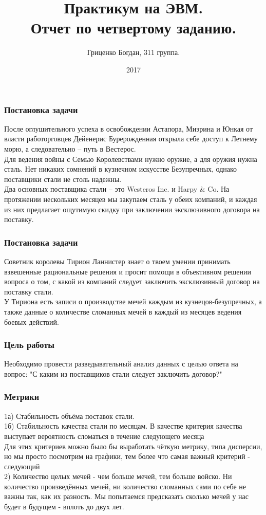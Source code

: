\documentclass[8pt]{beamer}
\title{Практикум на ЭВМ.\\ Отчет по четвертому заданию.}
\author{Гриценко Богдан, 311 группа.}
\institute{МГУ имени М.В. Ломоносова, Москва, Россия}
\date{2017}
\begin{document}
 
\frame{\titlepage}
 
\begin{frame}
\frametitle{Постановка задачи}
После оглушительного успеха в освобождении Астапора, Миэрина и Юнкая от власти работорговцев Дейенерис Бурерожденная открыла себе доступ к Летнему морю, а следовательно -- путь в Вестерос.\\
Для ведения войны с Семью Королевствами нужно оружие, а для оружия нужна сталь. Нет никаких сомнений в кузнечном искусстве Безупречных, однако поставщики стали не столь надежны.\\
Два основных поставщика стали -- это {Westeros Inc.} и {Harpy \& Co}. На протяжении нескольких месяцев мы закупаем сталь у обеих компаний, и каждая из них предлагает ощутимую скидку при заключении эксклюзивного договора на поставку.\\
\end{frame}

\begin{frame}
\frametitle{Постановка задачи}
Советник королевы Тирион Ланнистер знает о твоем умении принимать взвешенные рациональные решения и просит помощи в объективном решении вопроса о том, с какой из компаний следует заключить эксклюзивный договор на поставку стали.\\
У Тириона есть записи о производстве мечей каждым из кузнецов-безупречных, а также данные о количестве сломанных мечей в каждый из месяцев ведения боевых действий.\\
\end{frame}
 
\begin{frame}
\frametitle{Цель работы}
Необходимо провести разведывательный анализ данных с целью ответа на вопрос: "С каким из поставщиков стали следует заключить договор?"
\end{frame}

\begin{frame}
\frametitle{Метрики\\}
1а) Стабильность объёма поставок стали.\\
1б) Стабильность качества стали по месяцам. В качестве критерия качества выступает вероятность сломаться в течение следующего месяца\\
Для этих критериев можно было бы выработать чёткую метрику, типа дисперсии, но мы просто посмотрим на графики, тем более что самая важный критерий - следующий\\
2) Количество целых мечей - чем больше мечей, тем больше войско. Ни количество произведённых мечей, ни количество сломанных сами по себе не важны так, как их разность. Мы попытаемся предсказать сколько мечей у нас будет в будущем - вплоть до двух лет.\\
\end{frame}
\end{document}
